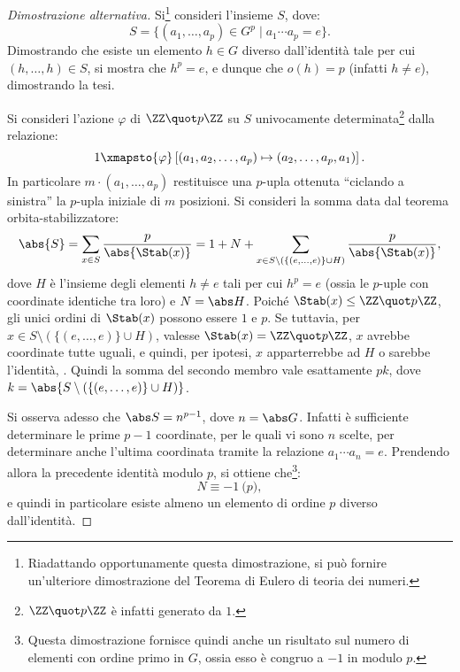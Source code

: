 \documentclass[12pt]{scrartcl}
\begin{document}
	\begin{proof}[Dimostrazione alternativa]
		Si\footnote{
			Riadattando opportunamente questa dimostrazione, si può fornire un'ulteriore dimostrazione del Teorema di Eulero di teoria dei numeri.
		} consideri l'insieme $S$, dove:
		\[ S = \{ (a_1, \ldots, a_p) \in G^p \mid a_1 \cdots a_p = e \}. \]
		Dimostrando che esiste un elemento $h \in G$ diverso dall'identità tale
		per cui $(h, \ldots, h) \in S$, si mostra che $h^p = e$, e dunque che
		$o(h) = p$ (infatti $h \neq e$), dimostrando la tesi. \medskip
		
		
		Si consideri l'azione $\varphi$
		di $\ZZ \quot p\ZZ$ su $S$ univocamente determinata\footnote{$\ZZ \quot p\ZZ$ è infatti generato da $1$.} dalla relazione:
		\[ 1 \xmapsto{\varphi} \left[ (a_1, a_2, \ldots, a_p) \mapsto (a_2, \ldots, a_p, a_1) \right]. \]
		In particolare $m \cdot (a_1, \ldots, a_p)$ restituisce una $p$-upla ottenuta
		``ciclando a sinistra'' la $p$-upla iniziale di $m$ posizioni. Si consideri la
		somma data dal teorema orbita-stabilizzatore:
		\[ \abs{S} = \sum_{x \in S} \frac{p}{\abs{\Stab(x)}} = 1 + N + \sum_{x \in S \setminus (\{(e,\ldots,e)\} \cup H)} \frac{p}{\abs{\Stab(x)}}, \]
		dove $H$ è l'insieme degli elementi $h \neq e$ tali per cui $h^p = e$ (ossia
		le $p$-uple con coordinate identiche tra loro) e $N = \abs H$.
		Poiché $\Stab(x) \leq \ZZ \quot p\ZZ$, gli unici ordini di $\Stab(x)$ possono
		essere $1$ e $p$. Se tuttavia, per $x \in S \setminus (\{(e,\ldots,e)\} \cup H)$,
		valesse $\Stab(x) = \ZZ \quot p\ZZ$, $x$ avrebbe coordinate tutte uguali,
		e quindi, per ipotesi, $x$ apparterrebbe ad $H$ o sarebbe l'identità, \Lightning. Quindi la somma del secondo membro vale esattamente $pk$, dove $k = \abs{S \setminus (\{(e,\ldots,e)\} \cup H)}$. \medskip
		
		
		Si osserva adesso che $\abs S = n^{p-1}$, dove $n = \abs G$. Infatti è sufficiente
		determinare le prime $p-1$ coordinate, per le quali vi sono $n$ scelte, per determinare
		anche l'ultima coordinata tramite la relazione $a_1 \cdots a_n = e$. Prendendo
		allora la precedente identità modulo $p$, si ottiene che\footnote{
			Questa dimostrazione fornisce quindi anche un risultato sul numero di elementi
			con ordine primo in $G$, ossia esso è congruo a $-1$ in modulo $p$.
		}:
		\[ N \equiv -1 \pod p, \]
		e quindi in particolare esiste almeno un elemento di ordine $p$ diverso dall'identità.
	\end{proof}
\end{document}

